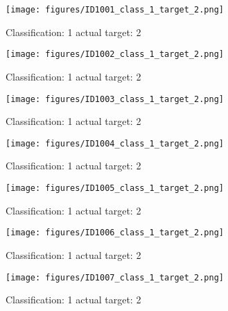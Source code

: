 \begin{figure}[h!]
\begin{center}
\texttt{[image: figures/ID1001\_class\_1\_target\_2.png]}
\end{center}
\caption{ Classification: 1 actual target: 2}
\label{fig:ID1001_class_1_target_2}
\end{figure}
\begin{figure}[h!]
\begin{center}
\texttt{[image: figures/ID1002\_class\_1\_target\_2.png]}
\end{center}
\caption{ Classification: 1 actual target: 2}
\label{fig:ID1002_class_1_target_2}
\end{figure}
\begin{figure}[h!]
\begin{center}
\texttt{[image: figures/ID1003\_class\_1\_target\_2.png]}
\end{center}
\caption{ Classification: 1 actual target: 2}
\label{fig:ID1003_class_1_target_2}
\end{figure}
\begin{figure}[h!]
\begin{center}
\texttt{[image: figures/ID1004\_class\_1\_target\_2.png]}
\end{center}
\caption{ Classification: 1 actual target: 2}
\label{fig:ID1004_class_1_target_2}
\end{figure}
\begin{figure}[h!]
\begin{center}
\texttt{[image: figures/ID1005\_class\_1\_target\_2.png]}
\end{center}
\caption{ Classification: 1 actual target: 2}
\label{fig:ID1005_class_1_target_2}
\end{figure}
\begin{figure}[h!]
\begin{center}
\texttt{[image: figures/ID1006\_class\_1\_target\_2.png]}
\end{center}
\caption{ Classification: 1 actual target: 2}
\label{fig:ID1006_class_1_target_2}
\end{figure}
\begin{figure}[h!]
\begin{center}
\texttt{[image: figures/ID1007\_class\_1\_target\_2.png]}
\end{center}
\caption{ Classification: 1 actual target: 2}
\label{fig:ID1007_class_1_target_2}
\end{figure}
